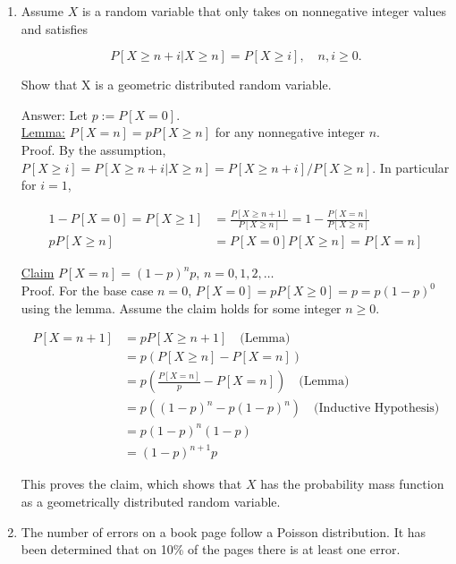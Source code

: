 \documentclass{article}
\begin{document}
\begin{enumerate}
\newpage
\item

Assume $X$ is a random variable that only takes on nonnegative integer values and satisfies

$$
P[X \geq n + i \vert X \geq n] = P[X \geq i], \quad n,i \geq 0.
$$

Show that X is a geometric distributed random variable.

Answer: Let $p := P[X = 0]$. \\

\underline{Lemma:} $P[X = n] = pP[X \geq n]$ for any nonnegative integer $n$. \\

Proof. By the assumption, $P[X \geq i] = P[X \geq n+i \vert X \geq n] = P[X \geq n+i] / P[X \geq n]$. In particular for $i = 1$, 

\begin{align*}
1 - P[X = 0] = P[X \geq 1] &= \frac{P[X \geq n+1]}{P[X \geq n]} = 1 - \frac{P[X = n]}{P[X \geq n]} \\
pP[X\geq n] &= P[X = 0]P[X \geq n] = P[X = n]
\end{align*}

\underline{Claim} $P[X = n] = (1-p)^np$, $n = 0,1,2,\dots $ \\

Proof. For the base case $n = 0$, $P[X = 0] = pP[X \geq 0] = p = p(1-p)^0$ using the lemma. Assume the claim holds for some integer $n \geq 0$. 

\begin{align*}
P[X = n+1] &= pP[X \geq n+1] \quad \text{(Lemma)} \\
&= p(P[X\geq n] - P[X =n]) \\
&= p \left( \frac{P[X = n]}{p} - P[X =n] \right) \quad \text{(Lemma)} \\
&= p((1-p)^n - p(1-p)^n) \quad \text{(Inductive Hypothesis)} \\
&= p(1-p)^n(1-p) \\
&= (1-p)^{n+1}p
\end{align*} 

This proves the claim, which shows that $X$ has the probability mass function as a geometrically distributed random variable.


\newpage
\item

The number of errors on a book page follow a Poisson distribution. It has been determined that on 10\% of the pages there is at least one error.


\end{enumerate}
\end{document}
